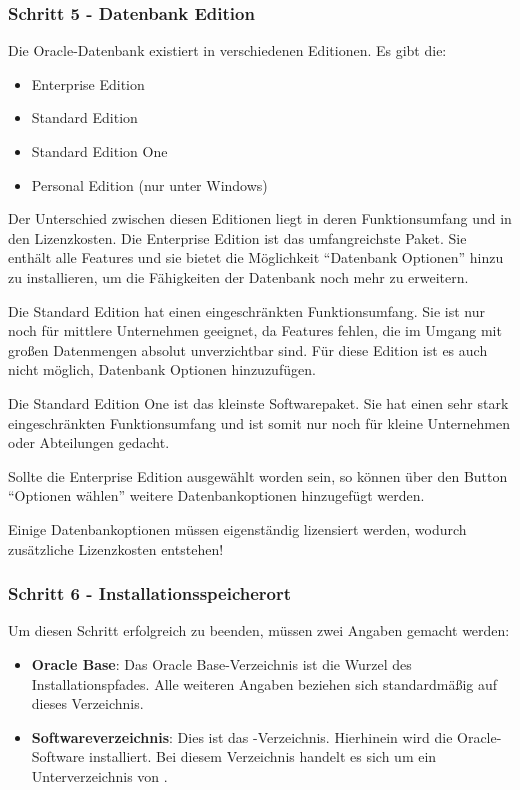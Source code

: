         \subsubsection{Schritt 5 - Datenbank Edition}
          Die Oracle-Datenbank existiert in verschiedenen Editionen. Es gibt die:
          \begin{itemize}
            \item Enterprise Edition
            \item Standard Edition
            \item Standard Edition One
            \item Personal Edition (nur unter Windows)
          \end{itemize}
          Der Unterschied zwischen diesen Editionen liegt in deren Funktionsumfang und in den Lizenzkosten. Die Enterprise Edition ist das umfangreichste Paket. Sie enth\"alt alle Features und sie bietet die M\"oglichkeit \enquote{Datenbank Optionen} hinzu zu installieren, um die F\"ahigkeiten der Datenbank noch mehr zu erweitern.

          Die Standard Edition hat einen eingeschr\"ankten Funktionsumfang. Sie ist nur noch f\"ur  mittlere Unternehmen geeignet, da Features fehlen, die im Umgang mit gro\ss{}en Datenmengen absolut unverzichtbar sind. F\"ur diese Edition ist es auch nicht m\"oglich, Datenbank Optionen hinzuzuf\"ugen.

          Die Standard Edition One ist das kleinste Softwarepaket. Sie hat einen sehr stark eingeschr\"ankten Funktionsumfang und ist somit nur noch f\"ur kleine Unternehmen oder Abteilungen gedacht.

          Sollte die Enterprise Edition ausgew\"ahlt worden sein, so k\"onnen \"uber den Button \enquote{Optionen w\"ahlen} weitere Datenbankoptionen hinzugef\"ugt werden.
          \begin{merke}
            Einige Datenbankoptionen m\"ussen eigenst\"andig lizensiert werden, wodurch zus\"atzliche Lizenzkosten entstehen!
          \end{merke}
        \subsubsection{Schritt 6 - Installationsspeicherort}
          Um diesen Schritt erfolgreich zu beenden, m\"ussen zwei Angaben gemacht werden:
          \begin{itemize}
            \item \textbf{Oracle Base}: Das Oracle Base-Verzeichnis ist die Wurzel des Installationspfades. Alle weiteren Angaben beziehen sich standardm\"a\ss{}ig auf dieses Verzeichnis.
            \item \textbf{Softwareverzeichnis}: Dies ist das -Verzeichnis. Hierhinein wird die Oracle-Software installiert. Bei diesem Verzeichnis handelt es sich um ein Unterverzeichnis von .
          \end{itemize}
